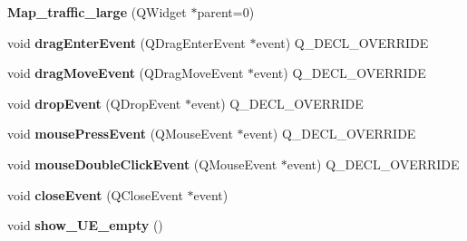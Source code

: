 \begin{DoxyCompactItemize}
\item 
{\bfseries Map\+\_\+traffic\+\_\+large} (Q\+Widget $\ast$parent=0)\hypertarget{class_map__traffic__large_a392082d8a30aff198b145ca8e5639047}{}\label{class_map__traffic__large_a392082d8a30aff198b145ca8e5639047}

\item 
void {\bfseries drag\+Enter\+Event} (Q\+Drag\+Enter\+Event $\ast$event) Q\+\_\+\+D\+E\+C\+L\+\_\+\+O\+V\+E\+R\+R\+I\+DE\hypertarget{class_map__traffic__large_ad7ce5fb3e6be1293da942fd10aeb311f}{}\label{class_map__traffic__large_ad7ce5fb3e6be1293da942fd10aeb311f}

\item 
void {\bfseries drag\+Move\+Event} (Q\+Drag\+Move\+Event $\ast$event) Q\+\_\+\+D\+E\+C\+L\+\_\+\+O\+V\+E\+R\+R\+I\+DE\hypertarget{class_map__traffic__large_ae1ec28696bbee262c86cc9d40b1273f7}{}\label{class_map__traffic__large_ae1ec28696bbee262c86cc9d40b1273f7}

\item 
void {\bfseries drop\+Event} (Q\+Drop\+Event $\ast$event) Q\+\_\+\+D\+E\+C\+L\+\_\+\+O\+V\+E\+R\+R\+I\+DE\hypertarget{class_map__traffic__large_a9629978b6321142f6fa876cc05ea67ed}{}\label{class_map__traffic__large_a9629978b6321142f6fa876cc05ea67ed}

\item 
void {\bfseries mouse\+Press\+Event} (Q\+Mouse\+Event $\ast$event) Q\+\_\+\+D\+E\+C\+L\+\_\+\+O\+V\+E\+R\+R\+I\+DE\hypertarget{class_map__traffic__large_ac26aeb2fc69a9c5194725899ed6efaf3}{}\label{class_map__traffic__large_ac26aeb2fc69a9c5194725899ed6efaf3}

\item 
void {\bfseries mouse\+Double\+Click\+Event} (Q\+Mouse\+Event $\ast$event) Q\+\_\+\+D\+E\+C\+L\+\_\+\+O\+V\+E\+R\+R\+I\+DE\hypertarget{class_map__traffic__large_a8f51778035a378577baa2389698995f2}{}\label{class_map__traffic__large_a8f51778035a378577baa2389698995f2}

\item 
void {\bfseries close\+Event} (Q\+Close\+Event $\ast$event)\hypertarget{class_map__traffic__large_a3d67f7a28093b96e9a1fd4e35e4c0f6f}{}\label{class_map__traffic__large_a3d67f7a28093b96e9a1fd4e35e4c0f6f}

\item 
void {\bfseries show\+\_\+\+U\+E\+\_\+empty} ()\hypertarget{class_map__traffic__large_aad136c366bfe9cdd3e3862adf499f60e}{}\label{class_map__traffic__large_aad136c366bfe9cdd3e3862adf499f60e}


\end{DoxyCompactItemize}
